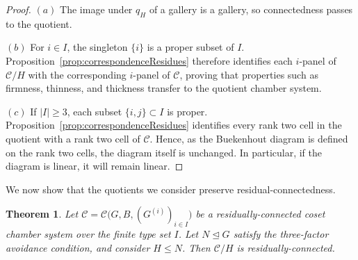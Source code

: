 \documentclass[10pt,a4paper]{amsart}
\newtheorem{thm}[prop]{Theorem}
\newcommand{\CC}{\mathcal{C}}
\begin{document}
\begin{proof}
$(a)$ The image under $q_H$ of a gallery is a gallery, so connectedness passes to the
quotient.  

$(b)$ For $i\in I$, the singleton $\{i\}$ is a proper subset of $I$.
Proposition~\ref{prop:correspondenceResidues} therefore identifies each
$i$-panel of $\CC/H$ with the corresponding $i$-panel of $\CC$, proving
that properties such as firmness, thinness, and thickness transfer to the quotient chamber system.

$(c)$ If $|I|\geq3$, each subset $\{i,j\}\subset I$ is proper. Proposition~\ref{prop:correspondenceResidues}
identifies every rank two cell in the quotient with a rank two cell
of $\CC$.  Hence, as the Buekenhout diagram is defined on the rank two cells, the diagram itself is
unchanged. In particular, if the diagram is linear, it will remain linear.
\end{proof}

We now show that the quotients we consider preserve residual-connectedness.


\begin{thm}
\label{thm:quotient_RC}
Let $ \CC=\CC\bigl(G,B,(G^{(i)})_{i\in I}\bigr)$
be a residually-connected coset chamber system over the finite type set $I$.  Let $N\trianglelefteq G$ satisfy
the three-factor avoidance condition, and consider $H\leq N$.  Then $\CC/H$ is
residually-connected.
\end{thm}
\end{document}
